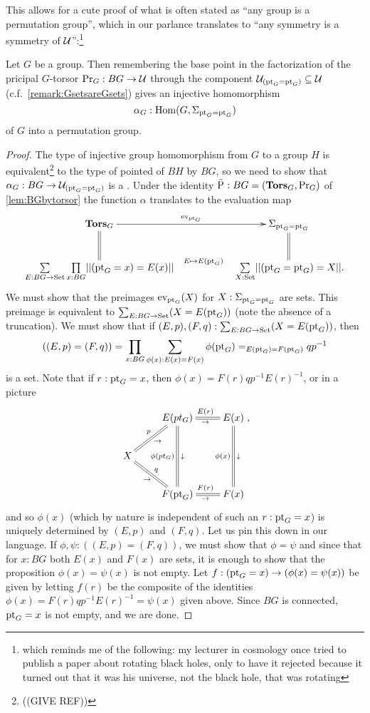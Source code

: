 This allows for a cute proof of what is often stated as ``any group is a permutation group'', which in our parlance translates to ``any symmetry is a symmetry of $\mathcal{U}$'':\footnote{which reminds me of the following: my lecturer in cosmology once tried to publish a paper about rotating black holes, only to have it rejected because it turned out that it was his universe, not the black hole, that was rotating}
\begin{lemma}
  \label{lem:allgpsarepermutationgps}Let $G$ be a group.  Then remembering the base point in the factorization of the pricipal $G$-torsor $\mathrm{Pr}_{{G}}:BG\to\mathcal{U}$ through the component $\mathcal{U}_{({\mathord{\mathrm{pt}}}_G={\mathord{\mathrm{pt}}}_G)}\subseteq\mathcal{U}$ (c.f.~\cref{remark:GsetsareGsets}) gives an injective homomorphism
$$\alpha_G:\mathrm{Hom}(G,\Sigma_{{\mathord{\mathrm{pt}}}_G={\mathord{\mathrm{pt}}}_G})$$  
of $G$ into a permutation group.
\end{lemma}
\begin{proof}
  The type of injective group homomorphism from $G$ to a group $H$ is equivalent\footnote{((GIVE REF))} to the type of pointed \coverings of $BH$ by $BG$, so we need to show that $\alpha_G:BG\to\mathcal{U}_{({\mathord{\mathrm{pt}}}_G={\mathord{\mathrm{pt}}}_G)}$ is a \covering.  
Under the identity $\bar{\mathrm{P}_{}}:BG=(\mathbf{Tors}_G,\mathrm{Pr}_{{G}})$ of \cref{lem:BGbytorsor} the function $\alpha$ translates to the evaluation map
$$\xymatrix{
  \typetorsor_G\ar[rr]^-{\mathrm{ev}_{\pt_G}}\ar@{=}[d]&&\Sigma_{\pt_G=\pt_G}\ar@{=}[d]\\
  \underset{E:BG\to\Set}\sum\,\underset{x:BG}\prod||(\pt_G=x)=E(x)||\ar@{}[rr]^-{E\mapsto E(\pt_G)}&&
\,\underset{X:\Set}\sum||(\pt_G=\pt_G)=X||.
}$$
We must show that the preimages $\mathrm{ev}_{{\mathord{\mathrm{pt}}}_G}(X)$ for $X:\Sigma_{{\mathord{\mathrm{pt}}}_G={\mathord{\mathrm{pt}}}_G}$ are sets.  
This preimage is equivalent to $\sum_{E:BG\to\mathord{\mathrm{Set}}}(X=E({\mathord{\mathrm{pt}}}_G))$ (note the absence of a truncation).  We must show that if $(E,p),(F,q):\sum_{E:BG\to\mathord{\mathrm{Set}}}(X=E({\mathord{\mathrm{pt}}}_G))$, then 
$$((E,p)=(F,q))=\prod_{x:BG}\sum_{\phi(x):E(x)=F(x)}\phi({\mathord{\mathrm{pt}}}_G)=_{E({\mathord{\mathrm{pt}}}_G)=F({\mathord{\mathrm{pt}}}_G)}qp^{-1}$$ is a set.  
Note that if $r:{\mathord{\mathrm{pt}}}_G=x$, then $\phi(x)=F(r)qp^{-1}E(r)^{-1}$, or in a picture
$$\xymatrix{&E(pt_G)\ar@{=}[r]^{E(r)}_\to\ar@{=}[dd]_{\phi(pt_G)}^\downarrow&E(x)\ar@{=}[dd]_{\phi(x)}^\downarrow\\
  X\ar@{=}[ur]^p_\to\ar@{=}[dr]^q_\to&&\\
  &F(\pt_G)\ar@{=}[r]^{F(r)}_\to&F(x)},$$
and so $\phi(x)$ (which by nature is independent of such an $r:{\mathord{\mathrm{pt}}}_G=x$) is uniquely determined by $(E,p)$ and $(F,q)$.  Let us pin this down in our language.
If $\phi,\psi:((E,p)=(F,q))$, we must show that $\phi=\psi$ and since that for $x:BG$ both $E(x)$ and $F(x)$ are sets, it is enough to show that the proposition $\phi(x)=\psi(x)$ is not empty.  Let $f:({\mathord{\mathrm{pt}}}_G=x)\to(\phi(x)=\psi(x))$ be given by letting $f(r)$ be the composite of the identities $\phi(x)=F(r)qp^{-1}E(r)^{-1}=\psi(x)$ given above.  
Since $BG$ is connected, ${\mathord{\mathrm{pt}}}_G=x$ is not empty, and we are done.
\end{proof}

